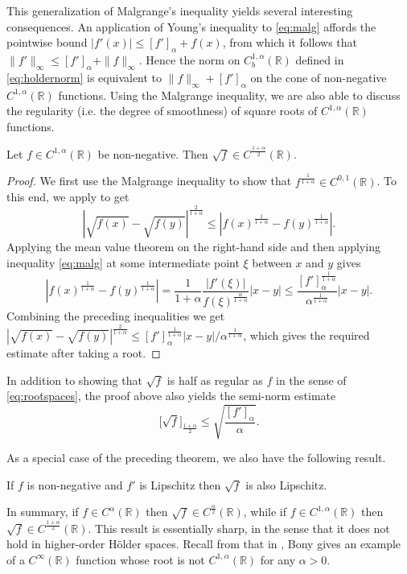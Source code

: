 \documentclass[oneside,hidelinks,indentfirst,10pt]{book}
\begin{document}
This generalization of Malgrange's inequality yields several interesting consequences. An application of Young's inequality to \eqref{eq:malg} affords the pointwise bound \(|f'(x)|\leq [f']_\alpha+f(x)\), from which it follows that \(\|f'\|_\infty\leq [f']_\alpha+\|f\|_\infty\). Hence the norm on \(C^{1,\alpha}_b(\mathbb{R})\) defined in \eqref{eq:holdernorm} is equivalent to \(\|f\|_\infty+[f']_\alpha\) on the cone of non-negative \(C^{1,\alpha}(\mathbb{R})\) functions. Using the Malgrange inequality, we are also able to discuss the regularity (i.e. the degree of smoothness) of square roots of \(C^{1,\alpha}(\mathbb{R})\) functions.


\begin{thm}\label{thm:rootsin}
Let \(f\in C^{1,\alpha}(\mathbb{R})\) be non-negative. Then \(\sqrt{f}\in C^{\frac{1+\alpha}{2}}(\mathbb{R})\).
\end{thm}


\begin{proof}
We first use the Malgrange inequality to show that \(f^\frac{1}{1+\alpha}\in C^{0,1}(\mathbb{R})\). To this end, we apply  to get
\[
    |\sqrt{f(x)}-\sqrt{f(y)}|^\frac{2}{1+\alpha}\leq |f(x)^\frac{1}{1+\alpha}-f(y)^\frac{1}{1+\alpha}|.
\]
Applying the mean value theorem on the right-hand side and then applying inequality \eqref{eq:malg} at some intermediate point \(\xi\) between \(x\) and \(y\) gives
\[
    |f(x)^\frac{1}{1+\alpha}-f(y)^\frac{1}{1+\alpha}|= \frac{1}{1+\alpha}\frac{|f'(\xi)|}{f(\xi)^\frac{\alpha}{1+\alpha}}|x-y|\leq \frac{[f']_\alpha^\frac{1}{1+\alpha}}{\alpha^\frac{1}{1+\alpha}}|x-y|.
\]
Combining the preceding inequalities we get \(|\sqrt{f(x)}-\sqrt{f(y)}|^\frac{2}{1+\alpha}\leq[f']_\alpha^\frac{1}{1+\alpha}|x-y|/\alpha^\frac{1}{1+\alpha}\), which gives the required estimate after taking a root.
\end{proof}

In addition to showing that \(\sqrt{f}\) is half as regular as \(f\) in the sense of \eqref{eq:rootspaces}, the proof above also yields the semi-norm estimate 
\[
    \big[\sqrt{f}\big]_{\frac{1+\alpha}{2}}\leq \sqrt{\frac{[f']_\alpha}{\alpha}}.
\]


As a special case of the preceding theorem, we also have the following result.


\begin{cor}
If \(f\) is non-negative and \(f'\) is Lipschitz then \(\sqrt{f}\) is also Lipschitz.
\end{cor}


In summary, if \(f\in C^{\alpha}(\mathbb{R})\) then \(\sqrt{f}\in C^\frac{\alpha}{2}(\mathbb{R})\), while if \(f\in C^{1,\alpha}(\mathbb{R})\) then \(\sqrt{f}\in C^\frac{1+\alpha}{2}(\mathbb{R})\). This result is essentially sharp, in the sense that it does not hold in higher-order H\"older spaces. Recall from  that in \cite{Bony}, Bony gives an example of a \(C^\infty(\mathbb{R})\) function whose root is not \(C^{1,\alpha}(\mathbb{R})\) for any \(\alpha>0\).
\end{document}
